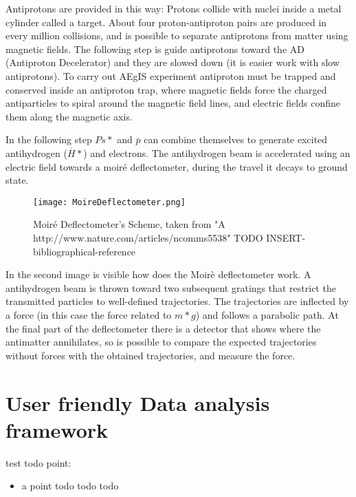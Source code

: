 Antiprotons are provided in this way:
Protons collide with nuclei inside a metal cylinder called a target. About four proton-antiproton pairs are produced in every million collisions, and is possible to separate antiprotons from matter using magnetic fields. The following step is guide antiprotons toward the AD (Antiproton Decelerator) and they are slowed down (it is easier work with slow antiprotons). To carry out AEgIS experiment antiproton must be trapped and conserved inside an antiproton trap, where magnetic fields force the charged antiparticles to spiral around the magnetic field lines, and electric fields confine them along the magnetic axis.

In the following step $ {Ps*} $ and $ \overline{p} $ can combine themselves to generate excited antihydrogen ($ \overline{H}* $) and electrons. The antihydrogen beam is accelerated using an electric field towards a moiré deflectometer, during the travel it decays to ground state.  


\begin{figure}[H]
\centering
\texttt{[image: MoireDeflectometer.png]} 
\caption{Moiré Deflectometer's Scheme, taken from "A
http://www.nature.com/articles/ncomms5538" TODO INSERT-bibliographical-reference}
\end{figure}

In the second image is visible how does the Moirè deflectometer work.
A antihydrogen beam is thrown toward two subsequent gratings that restrict the transmitted particles to well-defined trajectories. The trajectories are inflected by a force (in this case the force related to $ {m*g} $) and follows a parabolic path. At the final part of the deflectometer there is a detector that shows where the antimatter annihilates, so is possible to compare the expected trajectories without forces with the obtained trajectories, and measure the force.


\section{User friendly Data analysis framework}

test todo point:

\begin{itemize}
\item 
a point todo todo todo
\end{itemize}
